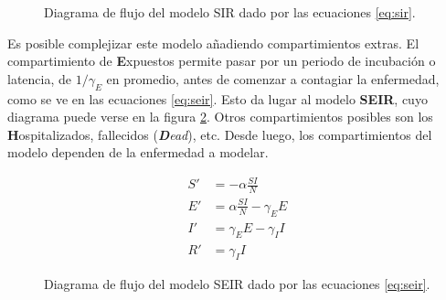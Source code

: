 \begin{figure}[!h]
\centering
{}

\caption{Diagrama de flujo del modelo SIR dado por las ecuaciones \ref{eq:sir}.} \label{fig:sir}
\end{figure}



Es posible complejizar este modelo añadiendo compartimientos extras. El compartimiento de \textbf{E}xpuestos permite pasar por un periodo de incubación o latencia, de \(1/\gamma_E\) en promedio, antes de comenzar a contagiar la enfermedad, como se ve en las ecuaciones \ref{eq:seir}. Esto da lugar al modelo \textbf{SEIR}, cuyo diagrama puede verse en la figura \ref{fig:seir}. Otros compartimientos posibles son los \textbf{H}ospitalizados, fallecidos (\textit{\textbf{D}ead}), etc. Desde luego, los compartimientos del modelo dependen de la enfermedad a modelar.


\begin{equation}
\label{eq:seir}
\begin{aligned}
S' &=  -\alpha \frac{SI}{N} \\
E' &= \alpha \frac{SI}{N} - \gamma_E E \\
I' &= \gamma_E E - \gamma_I I \\
R' &= \gamma_I I
\end{aligned}
\end{equation}


\begin{figure}[!h]
\centering
{}
\caption{Diagrama de flujo del modelo SEIR dado por las ecuaciones \ref{eq:seir}.} \label{fig:seir}
\end{figure}

